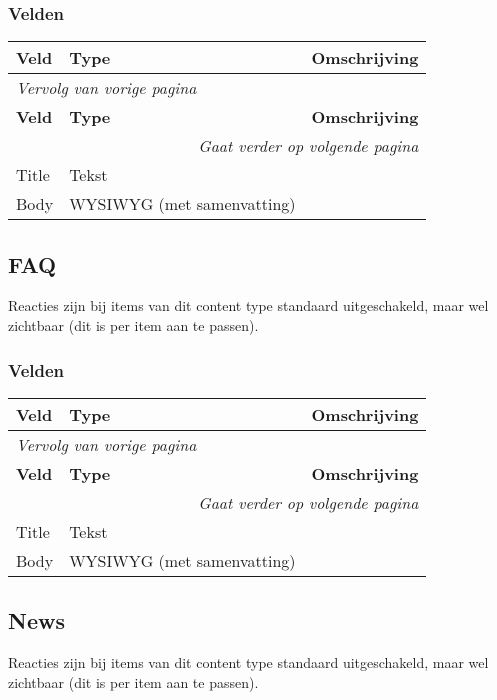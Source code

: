 \subsubsection{Velden}
  \begin{longtable}{| p{3.75cm}|p{3.75cm}|p{7.50cm}|}
  \hline
  \rowcolor{tableheader}
  \textbf{Veld} & \textbf{Type} & \textbf{Omschrijving}  \tabularnewline
  \hline
\endfirsthead
\multicolumn{3}{l}{\textit{Vervolg van vorige pagina}} \\
\hline
\rowcolor{tableheader}
  \textbf{Veld} & \textbf{Type} & \textbf{Omschrijving}  \tabularnewline
  \hline
\hline
\endhead
\multicolumn{3}{r}{\textit{Gaat verder op volgende pagina}} \\
\endfoot
\hline
\endlastfoot
  \raggedright{Title} & \raggedright{Tekst} & \raggedright{}  \tabularnewline
  \hline
  \raggedright{Body} & \raggedright{WYSIWYG (met samenvatting)} & \raggedright{}  \tabularnewline
  \hline
  \end{longtable}

\subsection{FAQ}
\label{sec:content-faq}
Reacties zijn bij items van dit content type standaard uitgeschakeld, maar wel zichtbaar (dit is per item aan te passen).

\subsubsection{Velden}
  \begin{longtable}{| p{3.75cm}|p{3.75cm}|p{7.50cm}|}
  \hline
  \rowcolor{tableheader}
  \textbf{Veld} & \textbf{Type} & \textbf{Omschrijving}  \tabularnewline
  \hline
\endfirsthead
\multicolumn{3}{l}{\textit{Vervolg van vorige pagina}} \\
\hline
\rowcolor{tableheader}
  \textbf{Veld} & \textbf{Type} & \textbf{Omschrijving}  \tabularnewline
  \hline
\hline
\endhead
\multicolumn{3}{r}{\textit{Gaat verder op volgende pagina}} \\
\endfoot
\hline
\endlastfoot
  \raggedright{Title} & \raggedright{Tekst} & \raggedright{}  \tabularnewline
  \hline
  \raggedright{Body} & \raggedright{WYSIWYG (met samenvatting)} & \raggedright{}  \tabularnewline
  \hline
  \end{longtable}

\subsection{News}
\label{sec:content-news}
Reacties zijn bij items van dit content type standaard uitgeschakeld, maar wel zichtbaar (dit is per item aan te passen).

